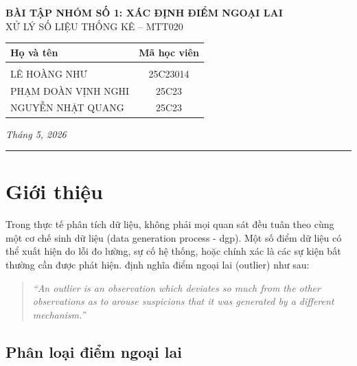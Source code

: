 \documentclass[11pt,a4paper]{article}
\begin{document}

\begin{center}
  {\LARGE\bfseries BÀI TẬP NHÓM SỐ 1: XÁC ĐỊNH ĐIỂM NGOẠI LAI}\\[0.5em]
  {\large XỬ LÝ SỐ LIỆU THỐNG KÊ -- MTT020 \\[0.3em]}
\end{center}

\begin{center}
\begin{tabular}{ l c }
\textbf{Họ và tên} & \textbf{Mã học viên} \\ \hline \\
LÊ HOÀNG NHƯ & 25C23014 \\
PHẠM ĐOÀN VỊNH NGHI & 25C23 \\
NGUYỄN NHẬT QUANG & 25C23 \\
\end{tabular}
\end{center}

\begin{center}
  \textit{Tháng 5, 2026}
\end{center}

\vspace{1em}
\hrule
\vspace{1.5em}

\section{Giới thiệu}

Trong thực tế phân tích dữ liệu, không phải mọi quan sát đều tuân theo cùng một cơ chế sinh dữ liệu (data generation process - dgp).
Một số điểm dữ liệu có thể xuất hiện do lỗi đo lường, sự cố hệ thống, hoặc chính xác là các sự kiện bất thường cần được phát hiện.
\textcite{hawkins1980} định nghĩa điểm ngoại lai (outlier) như sau:

\begin{quote}
  \textit{``An outlier is an observation which deviates so much from the other observations as to arouse suspicions that it was generated by a different mechanism.''}
\end{quote}

\subsection{Phân loại điểm ngoại lai}
\end{document}
